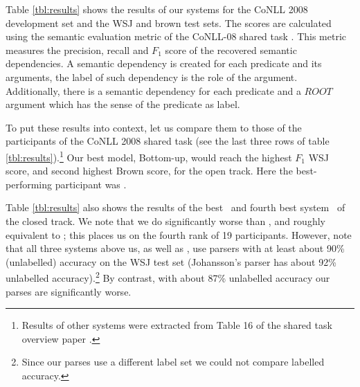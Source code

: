 
Table \ref{tbl:results} shows the results of our systems for the CoNLL 2008 development set and the WSJ and brown test sets. The scores are calculated using the semantic evaluation metric of the CoNLL-08 shared task \citep{surdeanu08conll}. This metric measures the precision, recall and $F_1$ score of the recovered semantic dependencies. A semantic dependency is created for each predicate and its arguments, the label of such dependency is the role of the argument. Additionally, there is a semantic dependency for each predicate and a $ROOT$ argument which has the sense of the predicate as label.



To put these results into context, let us compare them to those of the participants of the CoNLL 2008 shared task (see the last three rows of table \ref{tbl:results}).\footnote{Results of other systems were extracted from Table 16 of the shared task overview paper \citep{surdeanu08conll}.} Our best model, Bottom-up, would reach the highest $F_1$ WSJ score, and second highest Brown score, for the open track. Here the best-performing participant was \citet{vickrey08applying}. 

Table \ref{tbl:results} also shows the results of the best~\citep{johansson08dependency} and fourth best system~\citep{zhao08parsing} of the closed track. We note that we do significantly worse than \citet{johansson08dependency}, and roughly equivalent to \citet{zhao08parsing}; this places us on the fourth rank of 19 participants. However, note that all three systems above us, as well as  \citet{zhao08parsing}, use parsers with at least about 90\% (unlabelled) accuracy on the WSJ test set (Johansson's parser has about 92\% unlabelled accuracy).\footnote{Since our parses use a different label set we could not compare labelled accuracy.} By contrast, with about 87\% unlabelled accuracy our parses are significantly worse.   

